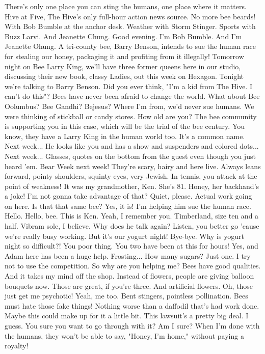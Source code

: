 \documentclass[a4paper,12pt]{article}
\begin{document}
There's only one place you can sting the humans, one place where it matters.
Hive at Five, The Hive's only full-hour action news source.
No more bee beards!
With Bob Bumble at the anchor desk. Weather with Storm Stinger. Sports with Buzz Larvi. And Jeanette Chung.
Good evening. I'm Bob Bumble.
And I'm Jeanette Ohung.
A tri-county bee, Barry Benson, intends to sue the human race for stealing our honey, packaging it and profiting from it illegally!
Tomorrow night on Bee Larry King, we'll have three former queens here in our studio, discussing their new book, classy Ladies, out this week on Hexagon.
Tonight we're talking to Barry Benson.
Did you ever think, "I'm a kid from The Hive. I can't do this"?
Bees have never been afraid to change the world.
What about Bee Oolumbus? Bee Gandhi? Bejesus?
Where I'm from, we'd never sue humans.
We were thinking of stickball or candy stores.
How old are you?
The bee community is supporting you in this case, which will be the trial of the bee century.
You know, they have a Larry King in the human world too.
It's a common name. Next week...
He looks like you and has a show and suspenders and colored dots...
Next week...
Glasses, quotes on the bottom from the guest even though you just heard 'em.
Bear Week next week! They're scary, hairy and here live.
Always leans forward, pointy shoulders, squinty eyes, very Jewish.
In tennis, you attack at the point of weakness!
It was my grandmother, Ken. She's 81.
Honey, her backhand's a joke!
I'm not gonna take advantage of that?
Quiet, please.
Actual work going on here.
Is that that same bee?
Yes, it is!
I'm helping him sue the human race.
Hello.
Hello, bee.
This is Ken.
Yeah, I remember you. Timberland, size ten and a half. Vibram sole, I believe.
Why does he talk again?
Listen, you better go 'cause we're really busy working.
But it's our yogurt night!
Bye-bye.
Why is yogurt night so difficult?!
You poor thing. You two have been at this for hours!
Yes, and Adam here has been a huge help.
Frosting...
How many sugars?
Just one. I try not to use the competition.
So why are you helping me?
Bees have good qualities. And it takes my mind off the shop. Instead of flowers, people are giving balloon bouquets now.
Those are great, if you're three.
And artificial flowers.
Oh, those just get me psychotic!
Yeah, me too.
Bent stingers, pointless pollination.
Bees must hate those fake things!
Nothing worse than a daffodil that's had work done.
Maybe this could make up for it a little bit.
This lawsuit's a pretty big deal.
I guess.
You sure you want to go through with it?
Am I sure? When I'm done with the humans, they won't be able to say, "Honey, I'm home," without paying a royalty!
\end{document}

